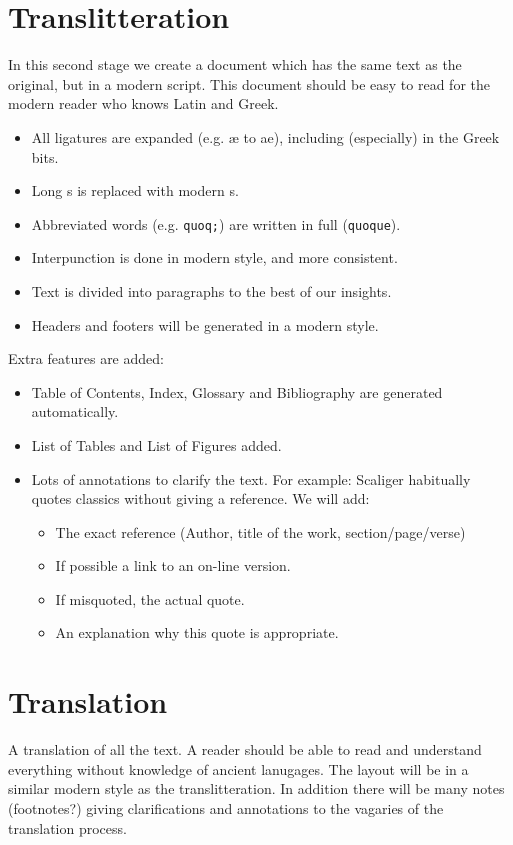 \documentclass[12pt]{report}
\begin{document}
\section{Translitteration}
In this second stage we create a document which has the same text as the original, but in a modern script.
This document should be easy to read for the modern reader who knows Latin and Greek.
\begin{itemize}
\item All ligatures are expanded (e.g. æ to ae), including (especially) in the Greek bits.
\item Long s is replaced with modern s.
\item Abbreviated words (e.g. \verb+quoq;+) are written in full (\verb+quoque+).
\item Interpunction is done in modern style, and more consistent.
\item Text is divided into paragraphs to the best of our insights.
\item Headers and footers will be generated in a modern style.
\end{itemize}
Extra features are added:
\begin{itemize}
\item Table of Contents, Index, Glossary and Bibliography are generated automatically.
\item List of Tables and List of Figures added.
\item Lots of annotations to clarify the text. For example: Scaliger habitually quotes classics without giving a reference.
We will add:
    \begin{itemize}
    \item The exact reference (Author, title of the work, section/page/verse)
    \item If possible a link to an on-line version.
    \item If misquoted, the actual quote.
    \item An explanation why this quote is appropriate.
    \end{itemize}
\end{itemize}


\section{Translation}
A translation of all the text. A reader should be able to read and understand everything without knowledge of ancient
lanugages. The layout will be in a similar modern style as the translitteration. In addition there will be many notes 
(footnotes?) giving clarifications and annotations to the vagaries of the translation process.
\end{document}
